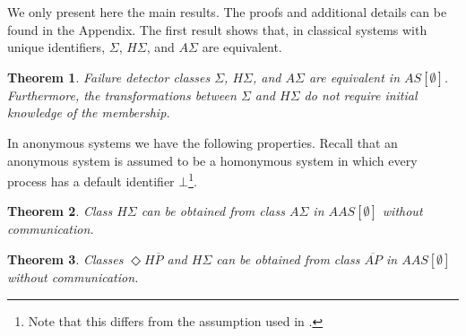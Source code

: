 \documentclass[10pt, conference, compsocconf]{IEEEtran}
\newtheorem{theorem}{Theorem}
\newcommand{\HS}{{H\Sigma}}
\newcommand{\AS}{{A\Sigma}}
\newcommand{\HP}{{ \Diamond H\overline{P}}}
\newcommand{\NAP}{{ \overline{\mathit{AP}}}}
\begin{document}
We only present here the main results. 
The proofs and additional details can be found in the Appendix.
The first result shows that, 
in classical systems with unique identifiers, $\Sigma$, $\HS$, 
and $\AS$ are equivalent.

\begin{theorem}
\label{thm:equivalent}
Failure detector classes $\Sigma$, $\HS$, and $\AS$ are equivalent 
in $AS[\emptyset]$. Furthermore,
the transformations between $\Sigma$ and $\HS$ do not require 
initial knowledge of the membership.
\end{theorem}



In anonymous systems we have the following properties. Recall that 
an anonymous system is assumed to be a homonymous system 
in which every process has a default identifier $\bot$\footnote{Note that this
differs from the assumption used in \cite{DBLP:conf/wdag/BonnetR10}.}.

\begin{theorem}
\label{thm:astohs}
Class $\HS$ can be obtained from class $\AS$ in 
$AAS[\emptyset]$ without communication.
\end{theorem}

\begin{theorem}
\label{thm:nap}
Classes $\HP$ and $\HS$ can be obtained from class $\NAP$ 
in $AAS[\emptyset]$ without communication.
\end{theorem}
\end{document}
